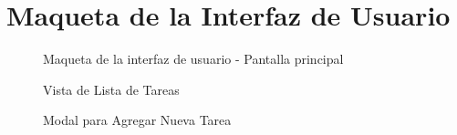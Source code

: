 \documentclass{pretexto/report}
\begin{document}
\section{Maqueta de la Interfaz de Usuario}
\begin{figure}[H]
    \centering
    \caption{Maqueta de la interfaz de usuario - Pantalla principal}
\end{figure}
\begin{figure}[H]
    \centering
    \caption{Vista de Lista de Tareas}
\end{figure}
\begin{figure}[H]
    \centering
    \caption{Modal para Agregar Nueva Tarea}
\end{figure}
\end{document}

